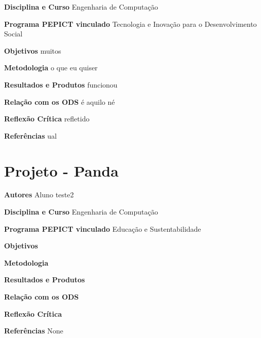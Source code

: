 \documentclass[12pt,openright,oneside,a4paper]{report}
\begin{document}
\vspace{0.7cm}
\noindent
\textbf{Disciplina e Curso}
Engenharia de Computação

\vspace{0.7cm}
\noindent
\textbf{Programa PEPICT vinculado}
Tecnologia e Inovação para o Desenvolvimento Social

\vspace{0.7cm}
\noindent
\textbf{Objetivos}
muitos

\vspace{0.7cm}
\noindent
\textbf{Metodologia}
o que eu quiser

\vspace{0.7cm}
\noindent
\textbf{Resultados e Produtos}
funcionou

\vspace{0.7cm}
\noindent
\textbf{Relação com os ODS}
é aquilo né

\vspace{0.7cm}
\noindent
\textbf{Reflexão Crítica}
refletido

\vspace{0.7cm}
\noindent
\textbf{Referências}
ual

\vspace{0.7cm}
\section{Projeto - Panda}
\noindent
\textbf{Autores}
Aluno teste2

\vspace{0.7cm}
\noindent
\textbf{Disciplina e Curso}
Engenharia de Computação

\vspace{0.7cm}
\noindent
\textbf{Programa PEPICT vinculado}
Educação e Sustentabilidade

\vspace{0.7cm}
\noindent
\textbf{Objetivos}


\vspace{0.7cm}
\noindent
\textbf{Metodologia}


\vspace{0.7cm}
\noindent
\textbf{Resultados e Produtos}


\vspace{0.7cm}
\noindent
\textbf{Relação com os ODS}


\vspace{0.7cm}
\noindent
\textbf{Reflexão Crítica}


\vspace{0.7cm}
\noindent
\textbf{Referências}
None
\end{document}
